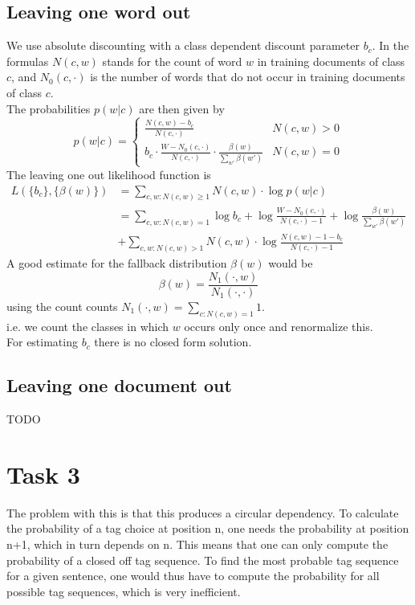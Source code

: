 \documentclass[%
   11pt,              %
   ngerman,           %
   a4paper,           %
   DIV11,             %
]{scrartcl}%
\begin{document}
\subsection*{Leaving one word out}
We use absolute discounting with a class dependent discount parameter $b_c$. In the formulas $N(c,w)$ stands for the count of word $w$ in training documents of class $c$, and $N_0(c, \cdot)$ is the number of words that do not occur in training documents of class $c.$\\
The probabilities $p(w|c)$ are then given by
\begin{equation*}
	p(w|c) = 
	\begin{cases}
		\frac{N(c,w) - b_c}{N(c, \cdot)} & N(c,w) > 0 \\
		b_c \cdot \frac{W - N_0(c, \cdot)}{N(c, \cdot)} \cdot \frac{\beta(w)}{\sum_{w'}\beta(w')} & N(c,w) = 0
	\end{cases}
\end{equation*}
The leaving one out likelihood function is
\begin{align*}
	L(\{b_c\},\{\beta(w)\}) &= \sum_{c,w: N(c,w) \geq 1}N(c,w) \cdot \log p(w|c) \\
	&= \sum_{c,w: N(c,w) = 1}\log b_c + \log \frac{W - N_0(c, \cdot)}{N(c,\cdot) - 1} + \log \frac{\beta(w)}{\sum_{w'}\beta(w')} \\
	&+ \sum_{c,w: N(c,w) > 1}N(c,w) \cdot \log \frac{N(c,w) - 1 - b_c}{N(c,\cdot) - 1}
\end{align*}
A good estimate for the fallback distribution $\beta(w)$ would be
\begin{equation*}
	\beta(w) = \frac{N_1(\cdot, w)}{N_1(\cdot, \cdot)}
\end{equation*}
using the count counts $N_1(\cdot, w) = \sum_{c: N(c,w) = 1} 1$.\\
i.e. we count the classes in which $w$ occurs only once and renormalize this. \\
For estimating $b_c$ there is no closed form solution.
\subsection*{Leaving one document out}
TODO
\section*{Task 3}
The problem with this is that this produces a circular dependency. To calculate the probability of a tag choice at position n, one needs the probability at position n+1, which in turn depends on n. This means that one can only compute the probability of a closed off tag sequence. To find the most probable tag sequence for a given sentence, one would thus have to compute the probability for all possible tag sequences, which is very inefficient.
\end{document}
